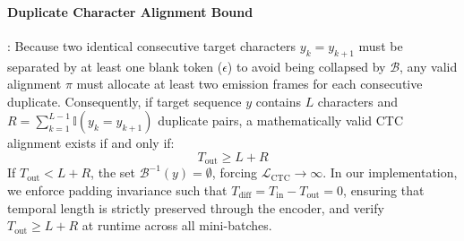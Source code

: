 \documentclass{article}
\begin{document}
\paragraph{Duplicate Character Alignment Bound}:
Because two identical consecutive target characters $y_k = y_{k+1}$ must be separated by at least one blank token ($\epsilon$) to avoid being collapsed by $\mathcal{B}$, any valid alignment $\pi$ must allocate at least two emission frames for each consecutive duplicate. Consequently, if target sequence $y$ contains $L$ characters and $R = \sum_{k=1}^{L-1} \mathbb{I}(y_k = y_{k+1})$ duplicate pairs, a mathematically valid CTC alignment exists if and only if:
\begin{equation}
    T_{\text{out}} \ge L + R
\end{equation}
If $T_{\text{out}} < L + R$, the set $\mathcal{B}^{-1}(y) = \emptyset$, forcing $\mathcal{L}_{\text{CTC}} \to \infty$. In our implementation, we enforce padding invariance such that $T_{\text{diff}} = T_{\text{in}} - T_{\text{out}} = 0$, ensuring that temporal length is strictly preserved through the encoder, and verify $T_{\text{out}} \ge L + R$ at runtime across all mini-batches.
\end{document}
